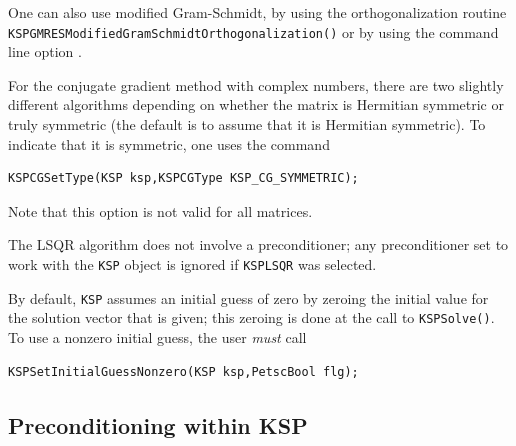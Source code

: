 One can also use
modified Gram-Schmidt,
by using the orthogonalization routine \break
\lstinline{KSPGMRESModifiedGramSchmidtOrthogonalization()} or by using the command line option
. 

For the conjugate gradient method with complex numbers, there are two
slightly different algorithms depending on whether the matrix is
Hermitian symmetric or truly symmetric (the default is to assume that
it is Hermitian symmetric). To indicate that it is symmetric, one uses the command
\begin{lstlisting}
KSPCGSetType(KSP ksp,KSPCGType KSP_CG_SYMMETRIC);
\end{lstlisting}
Note that this option is not valid for all matrices.

The LSQR algorithm does not involve a preconditioner; any preconditioner
set to work with the \lstinline{KSP} object is ignored if \lstinline{KSPLSQR} was selected.

By default, \lstinline{KSP} assumes an initial guess of zero by zeroing the initial
value for the solution vector that is given; this zeroing is done at the
call to \lstinline{KSPSolve()}. To use a nonzero
initial guess, the user {\em must} call
\begin{lstlisting}
KSPSetInitialGuessNonzero(KSP ksp,PetscBool flg);
\end{lstlisting}

\subsection{Preconditioning within KSP}
\label{sec_ksppc}

